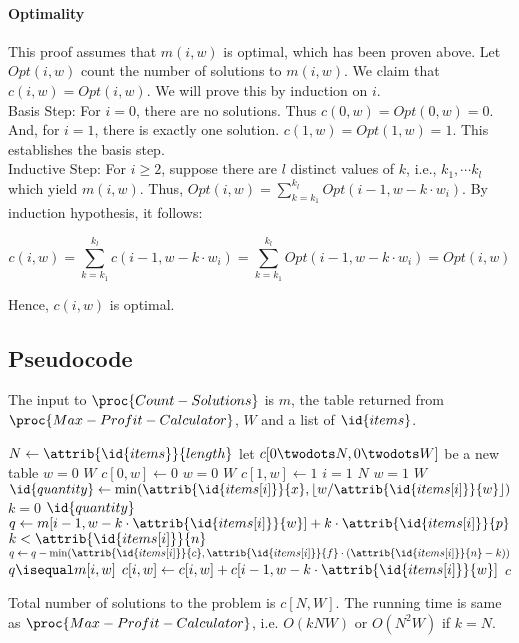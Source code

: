 \documentclass{article}
\newcommand{\floor}[1]{\left\lfloor #1 \right\rfloor}
\newcommand{\itemattr}[1]{\attrib{\id{items[i]}}{#1}}
\begin{document}
\paragraph{Optimality}
This proof assumes that $m(i, w)$ is optimal, which has been proven above. Let $Opt(i, w)$ count the number of solutions to $m(i, w)$. We claim that $c(i, w) = Opt(i, w)$. We will prove this by induction on $i$.\\
Basis Step: For $i = 0$, there are no solutions. Thus $c(0, w) = Opt(0, w) = 0$. And, for $i = 1$, there is exactly one solution. $c(1, w) = Opt(1, w) = 1$. This establishes the basis step.\\
Inductive Step: For $i \geq 2$, suppose there are $l$ distinct values of $k$, i.e., $k_1, \cdots k_l$ which yield $m(i, w)$. Thus, $Opt(i, w) = \sum_{k=k_1}^{k_l} Opt(i-1, w-k \cdot w_i)$. By induction hypothesis, it follows:

$$c(i, w) = \sum_{k=k_1}^{k_l} c(i-1, w-k \cdot w_i)
= \sum_{k=k_1}^{k_l} Opt(i-1, w-k \cdot w_i)
= Opt(i, w)$$

Hence, $c(i, w)$ is optimal.

\subsection{Pseudocode}
The input to $\proc{Count-Solutions}$ is $m$, the table returned from $\proc{Max-Profit-Calculator}$, $W$ and a list of $\id{items}$.

\begin{codebox}
\li $N \gets \attrib{\id{items}}{length}$
\li let $c[0 \twodots N, 0 \twodots W]$ be a new table
\li \For $w = 0$ \To $W$ \Do
\li 	$c[0, w] \gets 0$
	\End
\li \For $w = 0$ \To $W$ \Do
\li 	$c[1, w] \gets 1$
	\End
\li \For $i = 1$ \To $N$ \Do
\li 	\For $w = 1$ \To $W$ \Do
\li 		$\id{quantity} \gets \min(\itemattr{x}, \floor{w/\itemattr{w}})$
\li			\For $k = 0$ \To $\id{quantity}$ \Do
\li 			$q \gets m[i-1, w-k \cdot \itemattr{w}] + k \cdot \itemattr{p}$
\li 			\If $k < \itemattr{n}$ \Then
\li 				$q \gets q - \min(\itemattr{c}, \itemattr{f} \cdot (\itemattr{n} - k))$
				\End
\li 			\If $q \isequal m[i, w]$ \Then
\li 				$c[i, w] \gets c[i, w] + c[i-1, w-k \cdot \itemattr{w}]$
			\End
		\End		
	\End
\End
\li \Return $c$
\end{codebox}

Total number of solutions to the problem is $c[N, W]$. The running time is same as $\proc{Max-Profit-Calculator}$, i.e. $O(kNW)$ or $O(N^2W)$ if $k = N$.
\end{document}
